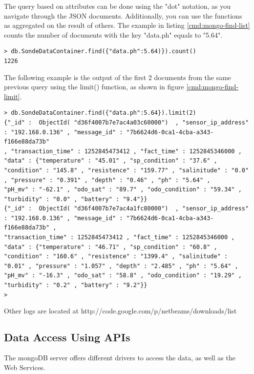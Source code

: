 The query based on attributes can be done using the "dot" notation, as you
navigate through the JSON documents. Additionally, you can use the functions as
aggregated on the result of others. The example in listing
\ref{cmd:mongo-find-list} counts the number of documents with the key
"data.ph" equals to "5.64".

\lstset{label=cmd:mongo-find-list,caption=Execution of mongo client}
\begin{lstlisting}
> db.SondeDataContainer.find({"data.ph":5.64)}).count()
1226
\end{lstlisting}

The following example is the output of the first 2 documents from the same
previous query using the limit() function, as shown in figure
\ref{cmd:mongo-find-limit}.

\lstset{label=cmd:mongo-find-limit,caption=Query Element with specific
projection limiting the result set size}
\begin{lstlisting}
> db.SondeDataContainer.find({"data.ph":5.64}).limit(2)
{"_id" :  ObjectId( "d36f4007b7e7ac4a03c60000")  , "sensor_ip_address" : "192.168.0.136" , "message_id" : "7b6624d6-0ca1-4cba-a343-f166e88da73b"
, "transaction_time" : 1252845473412 , "fact_time" : 1252845346000 , "data" : {"temperature" : "45.01" , "sp_condition" : "37.6" ,
"condition" : "145.8" , "resistence" : "159.77" , "salinitude" : "0.0" , "pressure" : "0.391" , "depth" : "0.46" , "ph" : "5.64" ,
"pH_mv" : "-62.1" , "odo_sat" : "89.7" , "odo_condition" : "59.34" , "turbidity" : "0.0" , "battery" : "9.4"}}
{"_id" :  ObjectId( "d36f4007b7e7ac4a1fc80000")  , "sensor_ip_address" : "192.168.0.136" , "message_id" : "7b6624d6-0ca1-4cba-a343-f166e88da73b" ,
"transaction_time" : 1252845473412 , "fact_time" : 1252845346000 , "data" : {"temperature" : "46.71" , "sp_condition" : "60.8" ,
"condition" : "160.6" , "resistence" : "1399.4" , "salinitude" : "0.01" , "pressure" : "1.057" , "depth" : "2.485" , "ph" : "5.64" ,
"pH_mv" : "-16.3" , "odo_sat" : "58.8" , "odo_condition" : "19.29" , "turbidity" : "0.2" , "battery" : "9.2"}}
>
\end{lstlisting}

Other logs are located at
http://code.google.com/p/netbeams/downloads/list

\subsection{Data Access Using APIs}

The mongoDB server offers different drivers to access the data, as well as the
Web Services.

